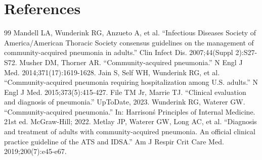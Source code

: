 \section*{References}
\begin{thebibliography}{99}
 Mandell LA, Wunderink RG, Anzueto A, et al. ``Infectious Diseases Society of America/American Thoracic Society consensus guidelines on the management of community-acquired pneumonia in adults.'' Clin Infect Dis. 2007;44(Suppl 2):S27-S72.
 Musher DM, Thorner AR. ``Community-acquired pneumonia.'' N Engl J Med. 2014;371(17):1619-1628.
 Jain S, Self WH, Wunderink RG, et al. ``Community-acquired pneumonia requiring hospitalization among U.S. adults.'' N Engl J Med. 2015;373(5):415-427.
 File TM Jr, Marrie TJ. ``Clinical evaluation and diagnosis of pneumonia.'' UpToDate, 2023.
 Wunderink RG, Waterer GW. ``Community-acquired pneumonia.'' In: Harrison\'s Principles of Internal Medicine. 21st ed. McGraw-Hill; 2022.
 Metlay JP, Waterer GW, Long AC, et al. ``Diagnosis and treatment of adults with community-acquired pneumonia. An official clinical practice guideline of the ATS and IDSA.'' Am J Respir Crit Care Med. 2019;200(7):e45-e67.
\end{thebibliography}
